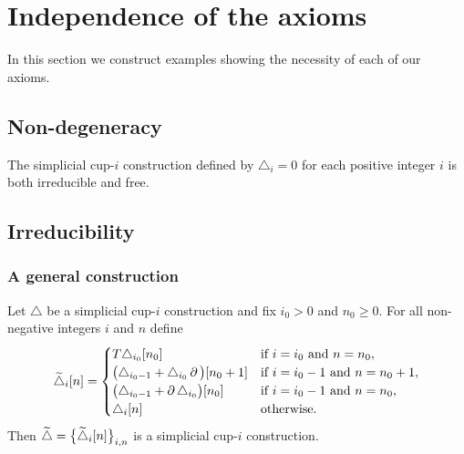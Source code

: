 \section{Independence of the axioms}

In this section we construct examples showing the necessity of each of our axioms.

\subsection{Non-degeneracy}

The simplicial \mbox{cup-$i$} construction defined by $\triangle_i = 0$ for each positive integer $i$ is both irreducible and free.

\subsection{Irreducibility}

\subsubsection{A general construction}

\begin{lemma}
	Let $\triangle$ be a simplicial \mbox{cup-$i$} construction and fix $i_0 > 0$ and $n_0 \geq 0$.
	For all non-negative integers $i$ and $n$ define
	\[
	\widetilde\triangle_i[n] =
	\begin{cases}
		T\triangle_{i_0}[n_0] & \text{if }i=i_0 \text{ and } n=n_0, \\
		\big(\triangle_{i_0-1} + \triangle_{i_0}\bd\big)[n_0+1] & \text{if }i=i_0-1 \text{ and } n=n_0+1, \\
		\big(\triangle_{i_0-1} + \bd\triangle_{i_0}\big)[n_0] & \text{if }i=i_0-1 \text{ and } n=n_0, \\
		\triangle_{i}[n] & \text{otherwise}.
	\end{cases}
	\]
	Then $\widetilde\triangle = \set[\big]{\widetilde\triangle_i[n]}_{i,n}$ is a simplicial \mbox{cup-$i$} construction.
\end{lemma}

